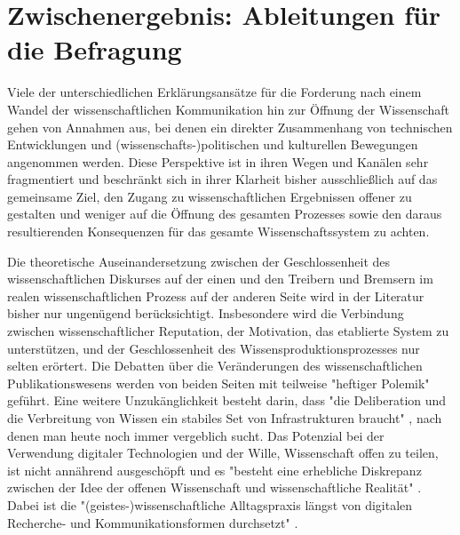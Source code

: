 \section{Zwischenergebnis: Ableitungen für die Befragung}

Viele der unterschiedlichen Erklärungsansätze für die Forderung nach einem Wandel der wissenschaftlichen Kommunikation hin zur Öffnung der Wissenschaft gehen von Annahmen aus, bei denen ein direkter Zusammenhang von technischen Entwicklungen und (wissenschafts-)politischen und kulturellen Bewegungen angenommen werden. Diese Perspektive ist in ihren Wegen und Kanälen sehr fragmentiert und beschränkt sich in ihrer Klarheit bisher ausschließlich auf das gemeinsame Ziel, den Zugang zu wissenschaftlichen Ergebnissen offener zu gestalten und weniger auf die Öffnung des gesamten Prozesses sowie den daraus resultierenden Konsequenzen für das gesamte Wissenschaftssystem zu achten.

Die theoretische Auseinandersetzung zwischen der Geschlossenheit des wissenschaftlichen Diskurses auf der einen und den Treibern und Bremsern im realen wissenschaftlichen Prozess auf der anderen Seite wird in der Literatur bisher nur ungenügend berücksichtigt. Insbesondere wird die Verbindung zwischen wissenschaftlicher Reputation, der Motivation, das etablierte System zu unterstützen, und der Geschlossenheit des Wissensproduktionsprozesses nur selten erörtert. Die Debatten über die Veränderungen des wissenschaftlichen Publikationswesens werden von beiden Seiten mit teilweise "heftiger Polemik" \cite[:12]{Naeder_2010} geführt. Eine weitere Unzukänglichkeit besteht darin, dass "die Deliberation und die Verbreitung von Wissen ein stabiles Set von Infrastrukturen braucht" \cite{Kelty_2004}, nach denen man heute noch immer vergeblich sucht. Das Potenzial bei der Verwendung digitaler Technologien und der Wille, Wissenschaft offen zu teilen, ist nicht annährend ausgeschöpft und es "besteht eine erhebliche Diskrepanz zwischen der Idee der offenen Wissenschaft und wissenschaftliche Realität" \cite{Scheliga_2014}. Dabei ist die "(geistes-)wissenschaftliche Alltagspraxis längst von digitalen Recherche- und Kommunikationsformen durchsetzt" \cite{hagner_2015_sache_buches}.

